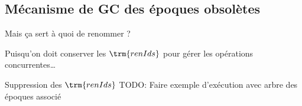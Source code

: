 \subsection{Mécanisme de GC des époques obsolètes}

\begin{frame}[standout]
    \alert{Mais ça sert à quoi de renommer ?}

    Puisqu'on doit conserver les $\trm{renIds}$ pour gérer les opérations concurrentes\dots
\end{frame}

\begin{frame}{Suppression des $\trm{renIds}$}
    TODO: Faire exemple d'exécution avec arbre des époques associé
\end{frame}
